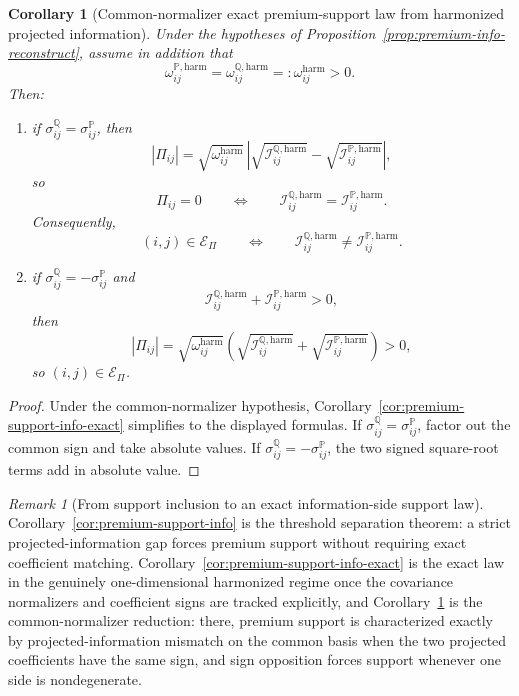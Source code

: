 \documentclass[11pt,a4paper]{amsart}
\theoremstyle{plain}
\newtheorem{corollary}[theorem]{Corollary}
\theoremstyle{definition}
\theoremstyle{remark}
\newtheorem{remark}[theorem]{Remark}
\newcommand{\PP}{\mathbb{P}}
\newcommand{\QQ}{\mathbb{Q}}
\newcommand{\cE}{\mathcal{E}}
\begin{document}
\begin{corollary}[Common-normalizer exact premium-support law from harmonized projected information]\label{cor:premium-support-info-exact-common}
Under the hypotheses of Proposition~\ref{prop:premium-info-reconstruct}, assume in addition that
\[
        \omega_{ij}^{\PP,\mathrm{harm}}
        =
        \omega_{ij}^{\QQ,\mathrm{harm}}
        =:
        \omega_{ij}^{\mathrm{harm}}
        >
        0.
\]
Then:
\begin{enumerate}[label=(\roman*)]
\item if \(\sigma_{ij}^\QQ=\sigma_{ij}^\PP\), then
\[
        |\Pi_{ij}|
        =
        \sqrt{\omega_{ij}^{\mathrm{harm}}}\,
        \left|
                \sqrt{\mathcal I_{ij}^{\QQ,\mathrm{harm}}}
                -
                \sqrt{\mathcal I_{ij}^{\PP,\mathrm{harm}}}
        \right|,
\]
so
\[
        \Pi_{ij}=0
        \qquad\Longleftrightarrow\qquad
        \mathcal I_{ij}^{\QQ,\mathrm{harm}}
        =
        \mathcal I_{ij}^{\PP,\mathrm{harm}}.
\]
Consequently,
\[
        (i,j)\in\cE_\Pi
        \qquad\Longleftrightarrow\qquad
        \mathcal I_{ij}^{\QQ,\mathrm{harm}}
        \neq
        \mathcal I_{ij}^{\PP,\mathrm{harm}}.
\]
\item if \(\sigma_{ij}^\QQ=-\sigma_{ij}^\PP\) and
\[
        \mathcal I_{ij}^{\QQ,\mathrm{harm}}
        +
        \mathcal I_{ij}^{\PP,\mathrm{harm}}
        >
        0,
\]
then
\[
        |\Pi_{ij}|
        =
        \sqrt{\omega_{ij}^{\mathrm{harm}}}
        \left(
                \sqrt{\mathcal I_{ij}^{\QQ,\mathrm{harm}}}
                +
                \sqrt{\mathcal I_{ij}^{\PP,\mathrm{harm}}}
        \right)
        >
        0,
\]
so \((i,j)\in\cE_\Pi\).
\end{enumerate}
\end{corollary}

\begin{proof}
Under the common-normalizer hypothesis,
Corollary~\ref{cor:premium-support-info-exact} simplifies to the displayed formulas.  If
\(\sigma_{ij}^\QQ=\sigma_{ij}^\PP\), factor out the common sign and take absolute values.  If
\(\sigma_{ij}^\QQ=-\sigma_{ij}^\PP\), the two signed square-root terms add in absolute value.
\end{proof}

\begin{remark}[From support inclusion to an exact information-side support law]\label{rem:premium-support-info-exact}
Corollary~\ref{cor:premium-support-info} is the threshold separation theorem: a strict
projected-information gap forces premium support without requiring exact coefficient matching.
Corollary~\ref{cor:premium-support-info-exact} is the exact law in the genuinely one-dimensional
harmonized regime once the covariance normalizers and coefficient signs are tracked explicitly, and
Corollary~\ref{cor:premium-support-info-exact-common} is the common-normalizer reduction: there,
premium support is characterized exactly by projected-information mismatch
on the common basis when the two projected coefficients have the same sign, and sign opposition
forces support whenever one side is nondegenerate.
\end{remark}
\end{document}
